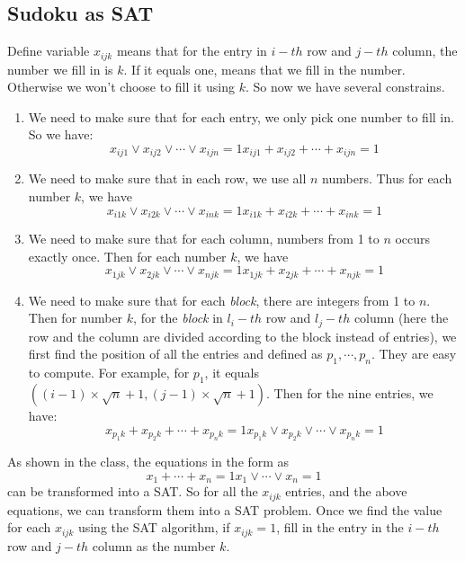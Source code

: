 \documentclass{article}
\begin{document}
\begin{enumerate}
	\section{Sudoku as SAT}
		Define variable $x_{ijk}$ means that for the entry in $i-th$ row and $j-th$ column, the number we fill in is $k$. If it equals one, means that we fill in the number. Otherwise we won't choose to fill it using $k$. So now we have several constrains.
		\begin{enumerate}
			\item We need to make sure that for each entry, we only pick one number to fill in. So we have:\begin{equation}
			x_{ij1} \vee x_{ij2} \vee \cdots \vee x_{ijn} = 1
			x_{ij1} + x_{ij2} + \cdots + x_{ijn} = 1
			\end{equation}
			\item We need to make sure that in each row, we use all $n$ numbers. Thus for each number $k$, we have \begin{equation}
			x_{i1k} \vee x_{i2k} \vee \cdots \vee x_{ink} = 1
			x_{i1k} + x_{i2k} + \cdots + x_{ink} = 1
			\end{equation}
			\item We need to make sure that for each column, numbers from 1 to $n$ occurs exactly once. Then for each number $k$, we have
			\begin{equation}
				x_{1jk} \vee x_{2jk} \vee \cdots \vee x_{njk} = 1
				x_{1jk} + x_{2jk} + \cdots + x_{njk} = 1
			\end{equation}
			\item We need to make sure that for each \emph{block}, there are integers from 1 to $n$. Then for number $k$, for the \emph{block} in $l_i-th$ row and $l_j-th$ column (here the row and the column are divided according to the block instead of entries), we first find the position of all the entries and defined as $p_1, \cdots, p_n$. They are easy to compute. For example, for $p_1$, it equals $((i - 1) \times \sqrt{n} + 1, (j - 1) \times \sqrt{n} + 1)$. Then for the nine entries, we have:
			\begin{equation}
			x_{p_1k} + x_{p_2k} + \cdots + x_{p_nk} = 1
			x_{p_1k} \vee x_{p_2k} \vee \cdots \vee x_{p_nk} = 1
			\end{equation}
			\end{enumerate}
			As shown in the class, the equations in the form as \begin{displaymath}
				x_1 + \cdots + x_n = 1
				x_1 \vee \cdots \vee x_n = 1
			\end{displaymath}
			can be transformed into a SAT. So for all the $x_{ijk}$ entries, and the above equations, we can transform them into a SAT problem. Once we find the value for each $x_{ijk}$ using the SAT algorithm, if $x_{ijk} = 1$, fill in the entry in the $i-th$ row and $j-th$ column as the number $k$.


\end{enumerate}
\end{document}
